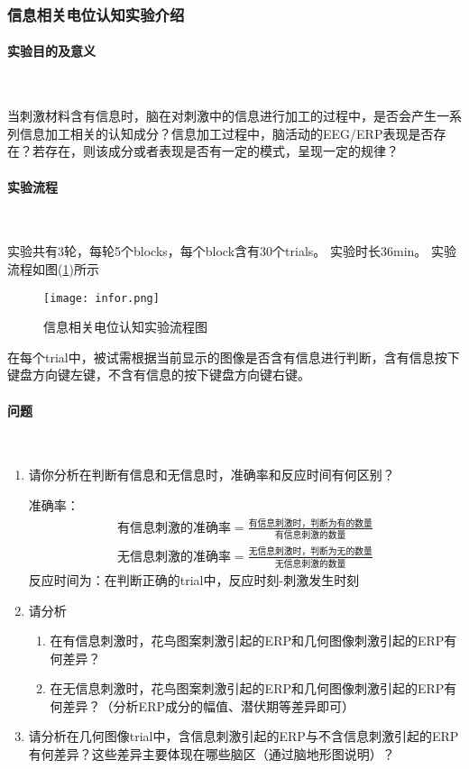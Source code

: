 \documentclass{hitreport}
\begin{document}
\subsubsection{信息相关电位认知实验介绍}

\paragraph{实验目的及意义}~{}

当刺激材料含有信息时，脑在对刺激中的信息进行加工的过程中，是否会产生一系列信息加工相关的认知成分？信息加工过程中，脑活动的EEG/ERP表现是否存在？若存在，则该成分或者表现是否有一定的模式，呈现一定的规律？

\paragraph{实验流程}~{}

实验共有3轮，每轮5个blocks，每个block含有30个trials。
实验时长36min。
实验流程如图(\ref{fig:labinfor})所示
\begin{figure}[htb]
\centering
\texttt{[image: infor.png]}
\caption{信息相关电位认知实验流程图}\label{fig:labinfor}
\end{figure}

在每个trial中，被试需根据当前显示的图像是否含有信息进行判断，含有信息按下键盘方向键左键，不含有信息的按下键盘方向键右键。

\paragraph{问题}~{}

\begin{enumerate}
\item 请你分析在判断有信息和无信息时，准确率和反应时间有何区别？

准确率：
\begin{align}
\text{有信息刺激的准确率} = \frac{\text{有信息刺激时，判断为有的数量}}{\text{有信息刺激的数量}}\\
\text{无信息刺激的准确率} = \frac{\text{无信息刺激时，判断为无的数量}}{\text{无信息刺激的数量}}
\end{align}
反应时间为：在判断正确的trial中，反应时刻-刺激发生时刻

\item 请分析
\begin{enumerate}
\item 在有信息刺激时，花鸟图案刺激引起的ERP和几何图像刺激引起的ERP有何差异？
\item 在无信息刺激时，花鸟图案刺激引起的ERP和几何图像刺激引起的ERP有何差异？（分析ERP成分的幅值、潜伏期等差异即可）
\end{enumerate}

\item 请分析在几何图像trial中，含信息刺激引起的ERP与不含信息刺激引起的ERP有何差异？这些差异主要体现在哪些脑区（通过脑地形图说明）？
\end{enumerate}
\end{document}

